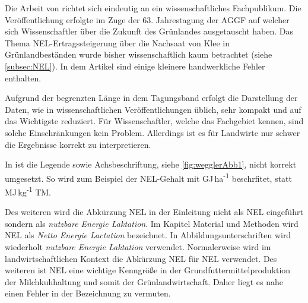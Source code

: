 Die Arbeit von \textcite{weggler2050leguminosen} richtet sich eindeutig an ein wissenschaftliches Fachpublikum.
Die Veröffentlichung erfolgte im Zuge der 63. Jahrestagung der \ac{AGGF} auf welcher sich Wissenschaftler über die Zukunft des Grünlandes ausgetauscht haben.
Das Thema \ac{NEL}-Ertragssteigerung über die Nachsaat von Klee in Grünlandbeständen wurde bisher wissenschaftlich kaum betrachtet (siehe \cref{subsec:NEL}).
In dem Artikel \parencite[33-36]{weggler2050leguminosen} sind einige kleinere handwerkliche Fehler enthalten.

Aufgrund der begrenzten Länge in dem Tagungsband erfolgt die Darstellung der Daten, wie in wissenschaftlichen Veröffentlichungen üblich, sehr kompakt und auf das Wichtigste reduziert.
Für Wissenschaftler, welche das Fachgebiet kennen, sind solche Einschränkungen kein Problem.
Allerdings ist es für Landwirte nur schwer die Ergebnisse korrekt zu interpretieren.

In \textcite[35]{weggler2050leguminosen} ist die Legende sowie Achsbeschriftung, siehe \cref{fig:wegglerAbb1}, nicht korrekt umgesetzt.
So wird zum Beispiel der \ac{NEL}-Gehalt mit GJ\,ha\textsuperscript{-1} beschrfitet, statt MJ\,kg\textsuperscript{-1} \ac{TM}.

Des weiteren wird die Abkürzung \ac{NEL} in der Einleitung nicht als \acl{NEL} eingeführt sondern als \textit{nutzbare Energie Laktation}.
Im Kapitel Material und Methoden wird \ac{NEL} als \textit{Netto Energie Lactation} bezeichnet.
In Abbildungsunterschriften wird wiederholt \textit{nutzbare Energie Laktation} verwendet.
Normalerweise wird im landwirtschaftlichen Kontext die Abkürzung \acs{NEL} für \acl{NEL} verwendet.
Des weiteren ist \ac{NEL} eine wichtige Kenngröße in der Grundfuttermittelproduktion der Milchkuhhaltung und somit der Grünlandwirtschaft.
Daher liegt es nahe einen Fehler in der Bezeichnung zu vermuten.






